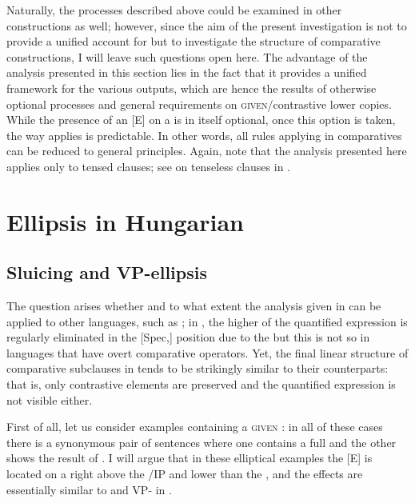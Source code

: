 Naturally, the  processes described above could be examined in other constructions as well; however, since the aim of the present investigation is not to provide a unified account for  but to investigate the structure of comparative constructions, I will leave such questions open here. The advantage of the analysis presented in this section lies in the fact that it provides a unified framework for the various outputs, which are hence the results of otherwise optional processes and general requirements on \textsc{given}/contrastive lower copies. While the presence of an [E]  on a  is in itself optional, once this option is taken, the way  applies is predictable. In other words, all  rules applying in  comparatives can be reduced to general principles. Again, note that the analysis presented here applies only to tensed clauses; see \citet{bacskaiatkari2014alh} on tenseless clauses in .

\section{Ellipsis in Hungarian} \label{sec:6ellipsisinh}
\subsection{Sluicing and VP-ellipsis} \label{sec:6sluicing}
The question arises whether and to what extent the analysis given in  can be applied to other languages, such as ; in , the higher  of the quantified expression is regularly eliminated in the [Spec,] position due to the  but this is not so in languages that have overt comparative operators. Yet, the final linear structure of comparative subclauses in  tends to be strikingly similar to their  counterparts: that is, only contrastive elements are preserved and the quantified expression is not visible either.

First of all, let us consider examples containing a \textsc{given} : in all of these cases there is a synonymous pair of sentences where one contains a full  and the other shows the result of . I will argue that in these elliptical examples the [E]  is located on a  right above the /IP and lower than the , and the effects are essentially similar to  and VP- in .

